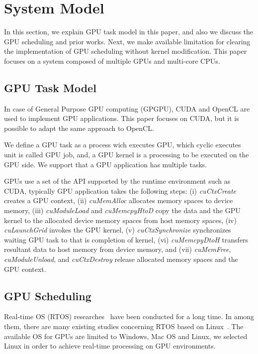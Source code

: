 \section{System Model}\label{sec:system_model}
In this section, we explain GPU task model in this paper, and also we discuss the GPU scheduling and prior works.
Next, we make available limitation for clearing the implementation of GPU scheduling without kernel modification.
This paper focuses on a system composed of multiple GPUs and multi-core CPUs.

\subsection{GPU Task Model}
In case of General Purpose GPU computing (GPGPU), CUDA and OpenCL are used to implement GPU applications.
This paper focuses on CUDA, but it is possible to adapt the same approach to OpenCL.

We define a GPU task as a process wich executes GPU,
which cyclic executes unit is called GPU job,
and, a GPU kernel is a processing to be executed on the GPU side.
We support that a GPU application has multiple tasks.

GPUs use a set of the API supported by the runtime environment such as CUDA,
typically GPU application takes the following steps:
(i) \textit{cuCtxCreate} creates a GPU context,
(ii) \textit{cuMemAlloc} allocates memory spaces to device memory, 
(iii) \textit{cuModuleLoad} and \textit{cuMemcpyHtoD} copy the data and the GPU kernel to the allocated device memory spaces from host memory spaces,
(iv) \textit{cuLaunchGrid} invokes the GPU kernel, 
(v) \textit{cuCtxSynchronize} synchronizes waiting GPU task to that is completion of kernel, 
(vi) \textit{cuMemcpyDtoH} transfers resultant data to host memory from device memory, and
(vii) \textit{cuMemFree}, \textit{cuModuleUnload}, and \textit{cuCtxDestroy} release allocated memory spaces and the GPU context.



\subsection{GPU Scheduling}
Real-time OS (RTOS) researches~\cite{spring,redline,itron,rk} have been conducted for a long time.
In among them, there are many existing studies concerning RTOS based on Linux~\cite{litmus,prk,rtai,yodaiken1999rtlinux,kato2009loadable}.
The available OS for GPUs are limited to Windows, Mac OS and Linux,
we selected Linux in order to achieve real-time processing on GPU environments.

